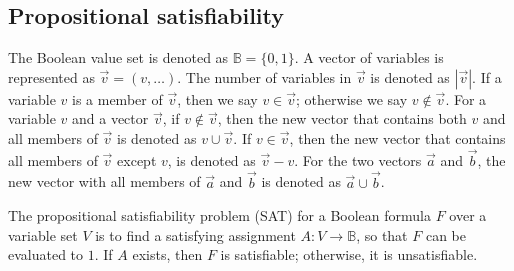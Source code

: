 \documentclass[runningheads,a4paper,orivec]{llncs}
\begin{document}
\subsection{Propositional satisfiability}\label{subsec_SAT}
The Boolean value set is denoted as $\mathbb{B}=\{0,1\}$.
A vector of variables is represented as $\vec{v}=(v,\dots)$.
The number of variables in $\vec{v}$ is denoted as $|\vec{v}|$.
If a variable $v$ is a member of $\vec{v}$,
then we say $v\in\vec{v}$;
otherwise we say $v\notin\vec{v}$.
For a variable $v$ and a vector $\vec{v}$,
if $v\notin\vec{v}$,
then the new vector that contains both $v$ and all members of $\vec{v}$ is denoted as $v\cup\vec{v}$.
If $v\in \vec{v}$,
then the new vector that contains all members of $\vec{v}$ except $v$,
is denoted as $\vec{v}-v$.
For the two vectors $\vec{a}$ and $\vec{b}$,
the new vector with all members of $\vec{a}$ and $\vec{b}$ is denoted as $\vec{a}\cup\vec{b}$.


The propositional satisfiability problem (SAT) for a Boolean formula $F$ over a variable set $V$ 
is to find a satisfying assignment $A:V\to \mathbb{B}$,
so that $F$ can be evaluated to $1$.
If $A$ exists, then $F$ is satisfiable;
otherwise,
it is unsatisfiable.

 


\end{document}
